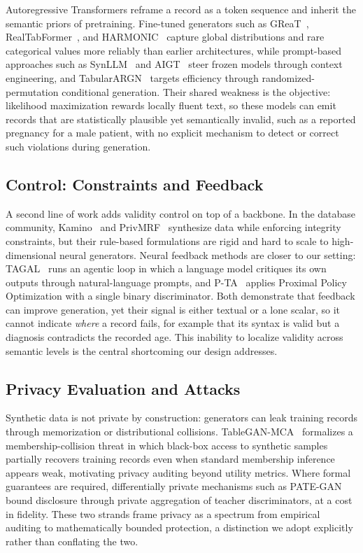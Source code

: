 Autoregressive Transformers reframe a record as a token sequence and inherit the semantic priors of pretraining. Fine-tuned generators such as GReaT~\cite{borisov2022language}, RealTabFormer~\cite{solatorio2023realtabformer}, and HARMONIC~\cite{Wang2024HARMONICHL} capture global distributions and rare categorical values more reliably than earlier architectures, while prompt-based approaches such as SynLLM~\cite{ilaty2025synllm} and AIGT~\cite{zhang2024aigtaigenerativetable} steer frozen models through context engineering, and TabularARGN~\cite{sidorenko2025tabularargn} targets efficiency through randomized-permutation conditional generation. Their shared weakness is the objective: likelihood maximization rewards locally fluent text, so these models can emit records that are statistically plausible yet semantically invalid, such as a reported pregnancy for a male patient, with no explicit mechanism to detect or correct such violations during generation.

\subsection{Control: Constraints and Feedback}
A second line of work adds validity control on top of a backbone. In the database community, Kamino~\cite{ge2021kamino} and PrivMRF~\cite{cai2021datasynthesis} synthesize data while enforcing integrity constraints, but their rule-based formulations are rigid and hard to scale to high-dimensional neural generators. Neural feedback methods are closer to our setting: TAGAL~\cite{ronval2025tagal} runs an agentic loop in which a language model critiques its own outputs through natural-language prompts, and P-TA~\cite{yang2025ptausingproximalpolicy} applies Proximal Policy Optimization with a single binary discriminator. Both demonstrate that feedback can improve generation, yet their signal is either textual or a lone scalar, so it cannot indicate \emph{where} a record fails, for example that its syntax is valid but a diagnosis contradicts the recorded age. This inability to localize validity across semantic levels is the central shortcoming our design addresses.

\subsection{Privacy Evaluation and Attacks}
Synthetic data is not private by construction: generators can leak training records through memorization or distributional collisions. TableGAN-MCA~\cite{hu2021tableganmca} formalizes a membership-collision threat in which black-box access to synthetic samples partially recovers training records even when standard membership inference appears weak, motivating privacy auditing beyond utility metrics. Where formal guarantees are required, differentially private mechanisms such as PATE-GAN~\cite{jordon2019pategan} bound disclosure through private aggregation of teacher discriminators, at a cost in fidelity. These two strands frame privacy as a spectrum from empirical auditing to mathematically bounded protection, a distinction we adopt explicitly rather than conflating the two.

